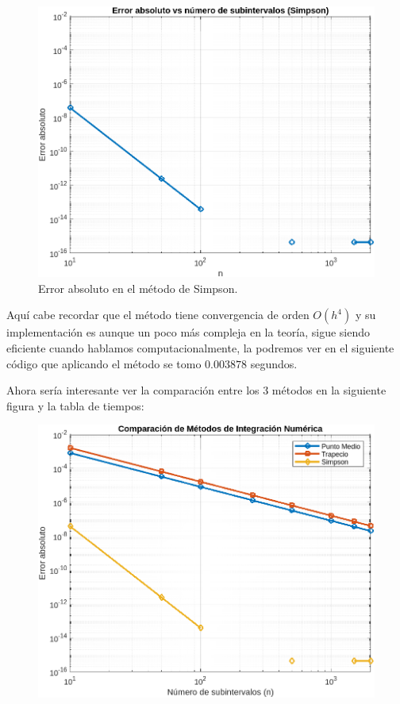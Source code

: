 \begin{homeworkProblem}
\begin{enumerate}
\begin{solucion}
\begin{itemize}
\begin{figure}[H]
\begin{center}
              \includegraphics[scale=0.7]{Figures/simpson.png}
            \end{center}
            \caption{Error absoluto en el método de Simpson.}
            \end{figure}
            Aquí cabe recordar que el método tiene convergencia de orden $O(h^4)$ y su implementación es aunque un poco más compleja en la teoría, sigue siendo eficiente cuando hablamos computacionalmente, la podremos ver en el siguiente código que aplicando el método se tomo $0.003878$ segundos.
            \newpage
            
            \newpage
        \end{itemize}
        Ahora sería interesante ver la comparación entre los $3$ métodos en la siguiente figura y la tabla de tiempos:
        \begin{figure}[H]
        \begin{center}
          \includegraphics[scale=0.7]{Figures/comparacion.png}

\end{center}
\end{figure}
\end{solucion}
\end{enumerate}
\end{homeworkProblem}
